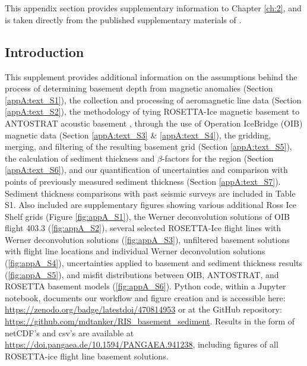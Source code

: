 
\chapter{} \label{appendix:A}
This appendix section provides supplementary information to Chapter \ref{ch:2}, and is taken directly from the published supplementary materials of \citet{tankersleybasement2022}.

\section{Introduction}
This supplement provides additional information on the assumptions behind the process of determining basement depth from magnetic anomalies (Section \ref{appA:text_S1}), the collection and processing of aeromagnetic line data (Section \ref{appA:text_S2}), the methodology of tying ROSETTA-Ice magnetic basement to ANTOSTRAT acoustic basement \citep{brancolinidescriptive1995}, through the use of Operation IceBridge (OIB) magnetic data \citep{cochranicebridge2014} (Section \ref{appA:text_S3} \& \ref{appA:text_S4}), the gridding, merging, and filtering of the resulting basement grid (Section \ref{appA:text_S5}), the calculation of sediment thickness and $\beta$-factors for the region (Section \ref{appA:text_S6}), and our quantification of uncertainties and comparison with points of previously measured sediment thickness (Section \ref{appA:text_S7}). Sediment thickness comparisons with past seismic surveys are included in Table S1. Also included are supplementary figures showing various additional Ross Ice Shelf grids (Figure \ref{fig:appA_S1}), the Werner deconvolution solutions of OIB flight 403.3 (\ref{fig:appA_S2}), several selected ROSETTA-Ice flight lines with Werner deconvolution solutions (\ref{fig:appA_S3}), unfiltered basement solutions with flight line locations and individual Werner deconvolution solutions (\ref{fig:appA_S4}), uncertainties applied to basement and sediment thickness results (\ref{fig:appA_S5}), and misfit distributions between OIB, ANTOSTRAT, and ROSETTA basement models (\ref{fig:appA_S6}). Python code, within a Jupyter notebook, documents our workflow and figure creation and is accessible here: \url{https://zenodo.org/badge/latestdoi/470814953} or at the GitHub repository: \url{https://github.com/mdtanker/RIS_basement_sediment}. Results in the form of netCDF’s and csv’s are available at \url{https://doi.pangaea.de/10.1594/PANGAEA.941238}, including figures of all ROSETTA-ice flight line basement solutions.

